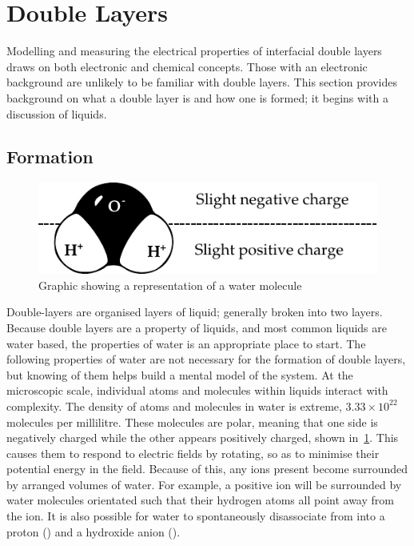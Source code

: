 

\section{Double Layers}
  \label{sect:background_doubleLayers}


  Modelling and measuring the electrical properties of interfacial double layers draws on both electronic and chemical concepts.
  Those with an electronic background are unlikely to be familiar with double layers.
  This section provides background on what a double layer is and how one is formed; it begins with a discussion of liquids.


  \subsection{Formation}
    \label{sub:background_doubleLayers_formation}


    \begin{figure}
        \begin{center}
            \includegraphics{content/introduction/graphics/polarWater}
        \end{center}
        \caption{Graphic showing a representation of a water molecule}
        \label{fig:waterMolecule}
    \end{figure}
    Double-layers are organised layers of liquid; generally broken into two layers.
    Because double layers are a property of liquids, and most common liquids are water based, the properties of water is an appropriate place to start.
    The following properties of water are not necessary for the formation of double layers, but knowing of them helps build a mental model of the system.
    At the microscopic scale, individual atoms and molecules within liquids interact with complexity.
    The density of atoms and molecules in water is extreme, $3.33\times10^{22}$  molecules per millilitre.
    These molecules are polar, meaning that one side is negatively charged while the other appears positively charged, shown in~\cref{fig:waterMolecule}.
    This causes them to respond to electric fields by rotating, so as to minimise their potential energy in the field.
    Because of this, any ions present become surrounded by arranged volumes of water.
    For example, a positive ion will be surrounded by water molecules orientated such that their hydrogen atoms all point away from the ion.
    It is also possible for water to spontaneously disassociate from  into a proton () and a hydroxide anion  ().

